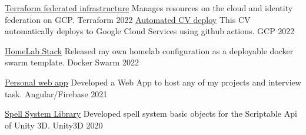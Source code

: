 

\begin{cvhonors}

  \cvhonor
    {\href{https://github.com/FarDust/terraform-infrastructure}{Terraform federated infrastructure}} %
    {Manages resources on the cloud and identity federation on GCP.} 
    {Terraform} %
    {2022} %
  \cvhonor
    {\href{https://github.com/FarDust/curriculum-vitae}{Automated CV deploy}} 
    {This CV automatically deploys to Google Cloud Services using github actions.} 
    {GCP} %
    {2022} %

  \cvhonor
    {\href{https://github.com/FarDust/homelab-stack}{HomeLab Stack}} 
    {Released my own homelab configuration as a deployable docker swarm template.} 
    {Docker Swarm} %
    {2022} %

  \cvhonor
    {\href{https://github.com/FarDust/fardust-web}{Personal web app}} 
    {Developed a Web App to host any of my projects and interview task.} 
    {Angular/Firebase} %
    {2021} %

  \cvhonor
    {\href{https://github.com/FarDust/SpellSystem}{Spell System Library}} 
    {Developed spell system basic objects for the Scriptable Api of Unity 3D.} 
    {Unity3D} %
    {2020} %

\end{cvhonors}
